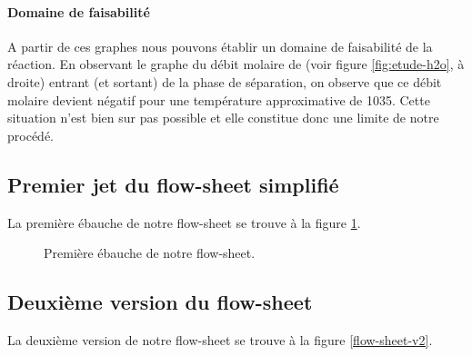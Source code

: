 \paragraph{Domaine de faisabilité}
A partir de ces graphes nous pouvons
établir un domaine de faisabilité de
la réaction. En observant le graphe
du débit molaire de  (voir 
figure \ref{fig:etude-h2o}, à droite) entrant
(et sortant) de la phase de séparation,
on observe que ce débit molaire
devient négatif pour une température
approximative de \unit{1035}{\kelvin}.
Cette situation n'est bien sur pas
possible et elle constitue donc une
limite de notre procédé.


\newpage
\annexe
\subsection{Premier jet du flow-sheet simplifié}
\label{app:flow-sheet}
La première ébauche de notre flow-sheet se trouve à la figure \ref{flow-sheet}.

\begin{figure}[htb!]
	\centering
	\caption{Première ébauche de notre flow-sheet.}
	\label{flow-sheet}
\end{figure}
\newpage

\subsection{Deuxième version du flow-sheet}
\label{appendix:flow-sheet}
La deuxième version de notre flow-sheet se trouve à la figure \ref{flow-sheet-v2}.

